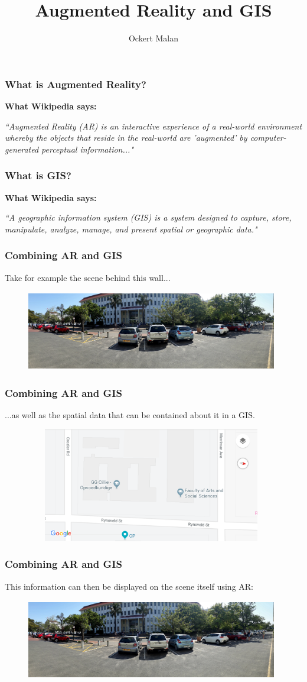 \documentclass[10pt, compress]{beamer}
\title{Augmented Reality and GIS}
\subtitle{}
\author{Ockert Malan}
\institute{}
\newcommand\myheading[1]{%
  \par\bigskip
  {\Large\bfseries#1}\par\smallskip}
\begin{document}
\maketitle

\begin{frame}[fragile]
\frametitle{What is Augmented Reality?}
\myheading{What Wikipedia says:}
\textit{``Augmented Reality (AR) is an interactive experience of a real-world environment whereby the objects that reside in the real-world are 'augmented' by computer-generated perceptual information..."}
\end{frame}

\begin{frame}[fragile]
\frametitle{What is GIS?}
\myheading{What Wikipedia says:}
\textit{``A geographic information system (GIS) is a system designed to capture, store, manipulate, analyze, manage, and present spatial or geographic data."}
\end{frame}

\begin{frame}[fragile]
  \frametitle{Combining AR and GIS}
  Take for example the scene behind this wall...
\begin{figure}
  \centering
 \includegraphics[width=11cm,height=3.5cm]{1.jpg}
\end{figure}
\end{frame}

\begin{frame}[fragile]
  \frametitle{Combining AR and GIS}
  ...as well as the spatial data that can be contained about it in a GIS.
\begin{figure}
  \centering
 \includegraphics[width=11cm,height=5cm]{2.png}
\end{figure}
\end{frame}

\begin{frame}[fragile]
  \frametitle{Combining AR and GIS}
  This information can then be displayed on the scene itself using AR:
\begin{figure}
  \centering
 \includegraphics[width=11cm,height=3.5cm]{1.jpg}
\end{figure}
\end{frame}
\end{document}
